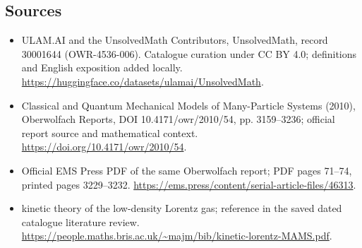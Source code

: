 \documentclass[11pt]{article}
\begin{document}
\subsection{Sources}
\begin{itemize}
\item[\hypertarget{source:30001644:1}{S1}] ULAM.AI and the UnsolvedMath Contributors, UnsolvedMath, record 30001644 (OWR-4536-006). Catalogue curation under CC BY 4.0; definitions and English exposition added locally.
\url{https://huggingface.co/datasets/ulamai/UnsolvedMath}.
\item[\hypertarget{source:30001644:2}{S2}] Classical and Quantum Mechanical Models of Many-Particle Systems (2010), Oberwolfach Reports, DOI 10.4171/owr/2010/54, pp. 3159--3236; official report source and mathematical context.
\url{https://doi.org/10.4171/owr/2010/54}.
\item[\hypertarget{source:30001644:3}{S3}] Official EMS Press PDF of the same Oberwolfach report; PDF pages 71--74, printed pages 3229--3232.
\url{https://ems.press/content/serial-article-files/46313}.
\item[\hypertarget{source:30001644:4}{S4}] kinetic theory of the low-density Lorentz gas; reference in the saved dated catalogue literature review.
\url{https://people.maths.bris.ac.uk/~majm/bib/kinetic-lorentz-MAMS.pdf}.
\end{itemize}
\label{end:30001644}
\end{document}
